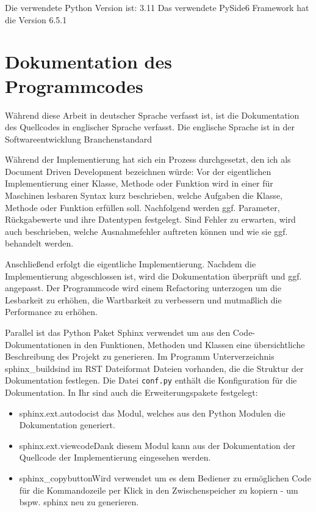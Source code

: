Die verwendete Python Version ist: 3.11
Das verwendete PySide6 Framework hat die Version 6.5.1

\section{Dokumentation des Programmcodes}

Während diese Arbeit in deutscher Sprache verfasst ist, ist die Dokumentation des Quellcodes in englischer Sprache verfasst. 
Die englische Sprache ist in der Softwareentwicklung Branchenstandard

Während der Implementierung hat sich ein Prozess durchgesetzt, den ich als Document Driven Development bezeichnen würde:
Vor der eigentlichen Implementierung einer Klasse, Methode oder Funktion wird in einer für Maschinen lesbaren Syntax kurz beschrieben, 
welche Aufgaben die Klasse, Methode oder Funktion erfüllen soll. Nachfolgend werden ggf. Parameter, Rückgabewerte und ihre Datentypen festgelegt. 
Sind Fehler zu erwarten, wird auch beschrieben, welche Ausnahmefehler auftreten können und wie sie ggf. behandelt werden. 

Anschließend erfolgt die eigentliche Implementierung. Nachdem die Implementierung abgeschlossen ist, wird die Dokumentation überprüft und ggf. angepasst.
Der Programmcode wird einem Refactoring unterzogen um die Lesbarkeit zu erhöhen, die Wartbarkeit zu verbessern und mutmaßlich die Performance zu erhöhen.

Parallel ist das Python Paket Sphinx verwendet um aus den Code-Dokumentationen in den Funktionen, 
Methoden und Klassen eine übersichtliche Beschreibung des Projekt zu generieren. 
Im Programm Unterverzeichnis \glqq sphinx\_build\grqq sind im RST Dateiformat Dateien vorhanden, 
die die Struktur der Dokumentation festlegen.
Die Datei \verb|conf.py| enthält die Konfiguration für die Dokumentation. In Ihr sind auch die Erweiterungspakete festgelegt: 

\begin{itemize}
    \item \glq sphinx.ext.autodoc\grq ist das Modul, welches aus den Python Modulen die Dokumentation generiert.
    \item \glq sphinx.ext.viewcode\grq Dank diesem Modul kann aus der Dokumentation der Quellcode der Implementierung eingesehen werden.
    \item \glq sphinx\_copybutton\grq Wird verwendet um es dem Bediener zu ermöglichen Code für die Kommandozeile per Klick in den Zwischenspeicher zu kopiern - um bspw. sphinx neu zu generieren.
\end{itemize}

